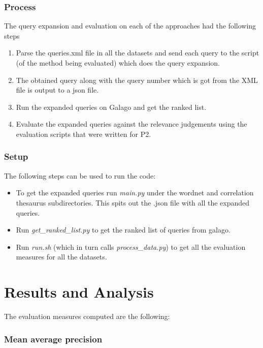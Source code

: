 \documentclass[a4paper, 12pt, notitlepage]{report}
\begin{document}
\subsection*{Process}
The query expansion and evaluation on each of the approaches had the following steps
\begin{enumerate}
\item Parse the queries.xml file in all the datasets and send each query to the script (of the method being evaluated) which does the query expansion.
\item The obtained query along with the query number which is got from the XML file is output to a json file.
\item Run the expanded queries on Galago and get the ranked list.
\item Evaluate the expanded queries against the relevance judgements using the evaluation scripts that were written for P2.
\end{enumerate}

\subsection*{Setup}
The following steps can be used to run the code:
\begin{itemize}
\item To get the expanded queries run \textit{main.py} under the wordnet and correlation thesaurus subdirectories. This spits out the .json file with all the expanded queries.
\item Run \textit{get\_ranked\_list.py} to get the ranked list of queries from galago.
\item Run \textit{run.sh} (which in turn calls \textit{process\_data.py}) to get all the evaluation measures for all the datasets.
\end{itemize}


\chapter{Results and Analysis}

The evaluation measures computed are the following:

\subsection*{Mean average precision}
\end{document}
